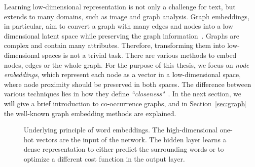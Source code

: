 \noindent
Learning low-dimensional representation is not only a challenge for text, but extends to many domains, such as image and graph analysis. Graph embeddings, in particular,  aim to convert a graph with many edges and nodes into a low dimensional latent space while preserving the graph information~.
Graphs are complex and contain many attributes. Therefore, transforming them into low-dimensional spaces is not a trivial task. There are various methods to embed nodes, edges or the whole graph. For the purpose of this thesis, we focus on \emph{node embeddings}, which represent each node as a vector in a low-dimensional space, where node proximity should be preserved in both spaces.
The difference between various techniques lies in how they define \emph{``closeness"}~. In the next section, we will give a brief introduction to co-occurrence graphs, and in Section~\ref{sec:graph} the well-known graph embedding methods are explained.  
\begin{figure}
\centering 
\resizebox{0.8\textwidth}{0.48\textwidth}{      

}
\caption{Underlying principle of word embeddings. The high-dimensional one-hot vectors are the input of the network. The hidden layer learns a dense representation to either predict the surrounding words or to optimize a different cost function in the output layer.}
\label{fig:emb}
\end{figure}

